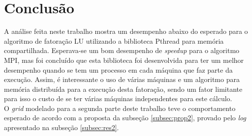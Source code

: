 \documentclass[12pt]{article}
\newcommand\tab[1][1cm]{\hspace*{#1}}
\begin{document}
\section{Conclusão}\label{sec:conc}

\tab A análise feita neste trabalho mostra um desempenho abaixo do esperado para o algoritmo de fatoração LU utilizando a biblioteca Pthread para memória compartilhada. Esperava-se um bom desempenho de \textit{speedup} para o algoritmo MPI, mas foi concluído que esta biblioteca foi desenvolvida para ter um melhor desempenho quando se tem um processo em cada máquina que faz parte da execução. Assim, é interessante o uso de várias máquinas e um algoritmo para memória distribuída para a execução desta fatoração, sendo um fator limitante para isso o custo de se ter várias máquinas independentes para este cálculo.
\\
\tab O \textit{grid} modelado para a segunda parte deste trabalho teve o comportamento esperado de acordo com a proposta da subseção \ref{subsec:prop2}, provado pelo \textit{log} apresentado na subseção \ref{subsec:res2}.


\end{document}
